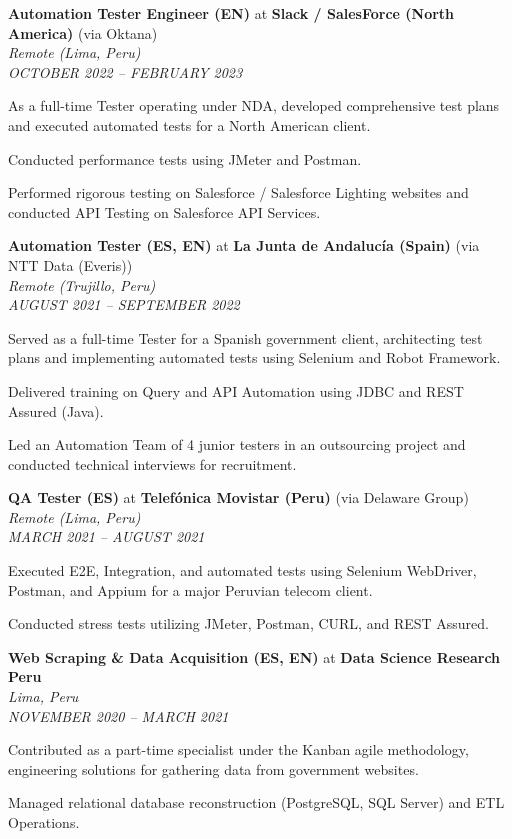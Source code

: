 \item \label{job:oktana}
\textbf{Automation Tester Engineer (EN)} at \textbf{Slack / SalesForce (North America)} (via Oktana) \\
\textit{Remote (Lima, Peru)} \\
\textit{OCTOBER 2022 -- FEBRUARY 2023}
\resumeItemListStart
    \item As a full-time Tester operating under NDA, developed comprehensive test plans and executed automated tests for a North American client.
    \item Conducted performance tests using JMeter and Postman.
    \item Performed rigorous testing on Salesforce / Salesforce Lighting websites and conducted API Testing on Salesforce API Services.
\resumeItemListEnd

\item \label{job:ntt}
\textbf{Automation Tester (ES, EN)} at \textbf{La Junta de Andalucía (Spain)} (via NTT Data (Everis)) \\
\textit{Remote (Trujillo, Peru)} \\
\textit{AUGUST 2021 -- SEPTEMBER 2022}
\resumeItemListStart
    \item Served as a full-time Tester for a Spanish government client, architecting test plans and implementing automated tests using Selenium and Robot Framework.
    \item Delivered training on Query and API Automation using JDBC and REST Assured (Java).
    \item Led an Automation Team of 4 junior testers in an outsourcing project and conducted technical interviews for recruitment.
\resumeItemListEnd

\item \label{job:delaware}
\textbf{QA Tester (ES)} at \textbf{Telefónica Movistar (Peru)} (via Delaware Group) \\
\textit{Remote (Lima, Peru)} \\
\textit{MARCH 2021 -- AUGUST 2021}
\resumeItemListStart
    \item Executed E2E, Integration, and automated tests using Selenium WebDriver, Postman, and Appium for a major Peruvian telecom client.
    \item Conducted stress tests utilizing JMeter, Postman, CURL, and REST Assured.
\resumeItemListEnd

\item \label{job:scraping}
\textbf{Web Scraping \& Data Acquisition (ES, EN)} at \textbf{Data Science Research Peru} \\
\textit{Lima, Peru} \\
\textit{NOVEMBER 2020 -- MARCH 2021}
\resumeItemListStart
    \item Contributed as a part-time specialist under the Kanban agile methodology, engineering solutions for gathering data from government websites.
    \item Managed relational database reconstruction (PostgreSQL, SQL Server) and ETL Operations.
\resumeItemListEnd

